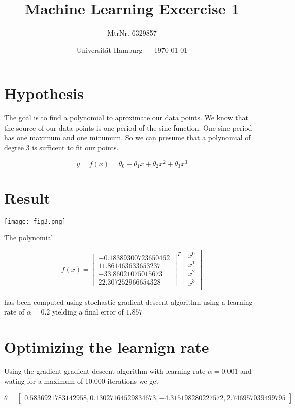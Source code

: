 \documentclass[parskip=half,a4paper]{scrartcl}
\title{Machine Learning Excercise 1}
\author{MtrNr. 6329857}
\date{Universität Hamburg --- \today}
\begin{document}
\maketitle


\section*{Hypothesis}

The goal is to find a polynomial to aproximate our data points. We know that the source of our data points is one period of the sine function. One sine period has one maximum and one minumum. So we can presume that a polynomial of degree 3 is sufficent to fit our points.

$$
y = f(x) =
  \theta_0
+ \theta_1 x
+ \theta_2 x^2
+ \theta_3 x^3
$$


\section*{Result}

\texttt{[image: fig3.png]}

The polynomial

$$
f(x) = \begin{bmatrix}
-0.18389300723650462 \\
11.861463633653237 \\
-33.86021075015673 \\
22.307252966654328
\end{bmatrix}^T
\begin{bmatrix}
x^0 \\
x^1 \\
x^2 \\
x^3 \\
\end{bmatrix}
$$

has been computed using stochastic gradient descent algorithm using a learning rate of $\alpha = 0.2$ yielding a final error of $1.857$


\section*{Optimizing the learnign rate}

Using the gradient gradient descent algorithm with learning rate $\alpha = 0.001$ and wating for a maximum of 10.000 iterations we get

$$
\theta = \begin{bmatrix}
0.5836921783142958,
0.13027164529834673,
-4.315198280227572,
2.746957039499795
\end{bmatrix}
$$
\end{document}
